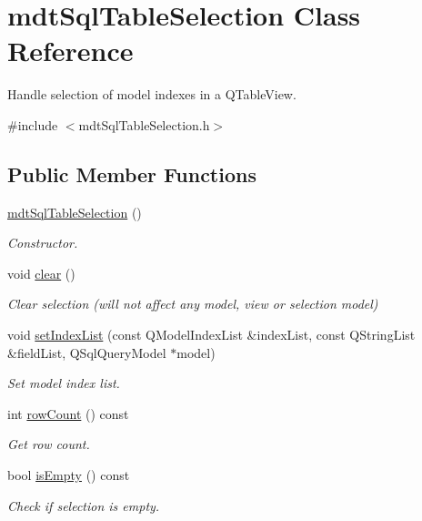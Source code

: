 \hypertarget{classmdt_sql_table_selection}{\section{mdt\-Sql\-Table\-Selection Class Reference}
\label{classmdt_sql_table_selection}
}


Handle selection of model indexes in a Q\-Table\-View.  




{\ttfamily \#include $<$mdt\-Sql\-Table\-Selection.\-h$>$}

\subsection*{Public Member Functions}
\begin{DoxyCompactItemize}
\item 
\hyperlink{classmdt_sql_table_selection_a2821fe9269802a36b77b89d8e22bb10b}{mdt\-Sql\-Table\-Selection} ()
\begin{DoxyCompactList}\small\item\em Constructor. \end{DoxyCompactList}\item 
void \hyperlink{classmdt_sql_table_selection_ab233d9312c053b20a8e1d35e26dcab86}{clear} ()
\begin{DoxyCompactList}\small\item\em Clear selection (will not affect any model, view or selection model) \end{DoxyCompactList}\item 
void \hyperlink{classmdt_sql_table_selection_a8a7fec3deddde52a3cfdb2ea96a75894}{set\-Index\-List} (const Q\-Model\-Index\-List \&index\-List, const Q\-String\-List \&field\-List, Q\-Sql\-Query\-Model $\ast$model)
\begin{DoxyCompactList}\small\item\em Set model index list. \end{DoxyCompactList}\item 
int \hyperlink{classmdt_sql_table_selection_a411d70a724981bd47f550d05cf3858be}{row\-Count} () const 
\begin{DoxyCompactList}\small\item\em Get row count. \end{DoxyCompactList}\item 
bool \hyperlink{classmdt_sql_table_selection_a739d9d474c3df10c01ea4094a3f8c201}{is\-Empty} () const 
\begin{DoxyCompactList}\small\item\em Check if selection is empty. \end{DoxyCompactList}\item 

\end{DoxyCompactItemize}
